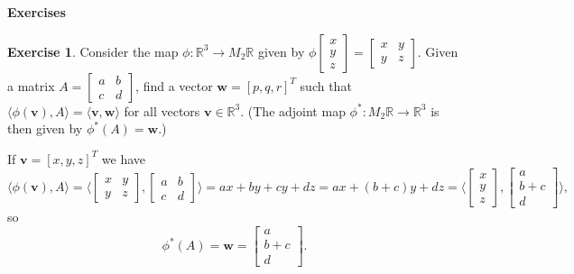 \documentclass{amsart}
\newcommand{\R}         {{\mathbb{R}}}
\newcommand{\bsm}       {\left[\begin{smallmatrix}}
\newcommand{\esm}       {\end{smallmatrix}\right]}
\newcommand{\ip}[1]     {\langle #1\rangle}
\newcommand{\vv}        {\mathbf{v}}
\newcommand{\vw}        {\mathbf{w}}
\renewcommand{\:}       {\colon}
\theoremstyle{definition}
\newtheorem{exercise}{Exercise}[section]
\renewenvironment{solution}{\SolutionAtEnd}{\endSolutionAtEnd}
\begin{document}

\begin{center}
 \Large \textbf{Exercises}
\end{center}

\begin{exercise}
 Consider the map $\phi\:\R^3\to M_2\R$ given by 
 $\phi\bsm x\\ y\\ z\esm = \bsm x& y\\ y&z\esm$.  Given a
 matrix $A=\bsm a&b\\ c&d\esm$, find a vector $\vw=[p,q,r]^T$ such
 that $\ip{\phi(\vv),A}=\ip{\vv,\vw}$ for all vectors
 $\vv\in\R^3$.  (The adjoint map $\phi^*\:M_2\R\to\R^3$ is
 then given by $\phi^*(A)=\vw$.)
\end{exercise}
\begin{solution}
 If $\vv=[x,y,z]^T$ we have 
 \[ \ip{\phi(\vv),A} =
    \ip{\bsm x&y\\ y&z\esm,\bsm a&b\\ c&d\esm} = 
    ax+by+cy+dz = ax + (b+c)y + dz = 
    \ip{\bsm x\\ y\\ z\esm, \bsm a\\ b+c\\ d\esm},
 \]
 so
 \[ \phi^*(A) = \vw = \bsm a\\ b+c\\ d\esm. \]
\end{solution}
\end{document}

